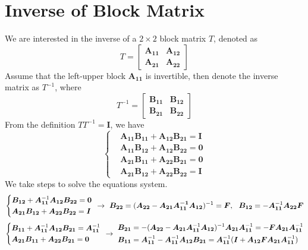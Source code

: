 \documentclass[11pt]{article}
\begin{document}
\section{Inverse of Block Matrix}
We are interested in the inverse of a $2\times 2$ block matrix $T$, denoted as
\begin{equation}
    T = \begin{bmatrix}
    \bm{A_{11}} & \bm{A_{12}} \\ \bm{A_{21}} & \bm{A_{22}}
    \end{bmatrix}
\end{equation}
Assume that the left-upper block $\bm{A_{11}}$ is invertible, then denote the inverse matrix as $T^{-1}$, where
\begin{equation}
    T^{-1} = \begin{bmatrix}
    \bm{B_{11}} & \bm{B_{12}} \\ \bm{B_{21}} & \bm{B_{22}}
    \end{bmatrix}
\end{equation}
From the definition $TT^{-1} = \bm{I}$, we have
\begin{equation}
    \left\{
    \begin{aligned}
        &\bm{A_{11}} \bm{B_{11}} + \bm{A_{12}}\bm{B_{21}} = \bm{I} \\
        &\bm{A_{11}} \bm{B_{12}} + \bm{A_{12}}\bm{B_{22}} = \bm{0} \\
        &\bm{A_{21}} \bm{B_{11}} + \bm{A_{22}} \bm{B_{21}} = \bm{0} \\
        &\bm{A_{21}} \bm{B_{12}} + \bm{A_{22}} \bm{B_{22}} = \bm{I} 
    \end{aligned}
    \right.
\end{equation}
We take steps to solve the equations system.
\begin{equation}
    \left\{ \begin{aligned}
        &\bm{B_{12}} + \bm{A_{11}}^{-1} \bm{A_{12}}\bm{B_{22}} = \bm{0} \\
        &\bm{A_{21}} \bm{B_{12}} + \bm{A_{22}} \bm{B_{22}} = \bm{I}
    \end{aligned}
    \right.~\rightarrow~\bm{B_{22}} = (\bm{A_{22}} - \bm{A_{21}}\bm{A_{11}^{-1}} \bm{A_{12}})^{-1} = \bm{F},~~\bm{B_{12}} = -\bm{A_{11}}^{-1}\bm{A_{22}}\bm{F} \notag
\end{equation}
\begin{equation}
\left\{ \begin{aligned}
    &\bm{B_{11}} + \bm{A_{11}}^{-1}\bm{A_{12}}\bm{B_{21}} = \bm{A_{11}}^{-1} \\
    &\bm{A_{21}}\bm{B_{11}} + \bm{A_{22}}\bm{B_{21}} = \bm{0}
\end{aligned} \right.~\rightarrow~\begin{aligned}\bm{B_{21}} &= -(\bm{A_{22}} - \bm{A_{21}}\bm{A_{11}}^{-1}\bm{A_{12}})^{-1} \bm{A_{21}}\bm{A_{11}}^{-1} = -\bm{F}\bm{A_{21}}\bm{A_{11}}^{-1} \\ 
\bm{B_{11}} &=  \bm{A_{11}}^{-1}-\bm{A_{11}}^{-1}\bm{A_{12}}\bm{B_{21}} = \bm{A_{11}}^{-1}(\bm{I} + \bm{A_{12}}\bm{F} \bm{A_{21}}\bm{A_{11}}^{-1}) \notag
\end{aligned}
\end{equation}
\end{document}
